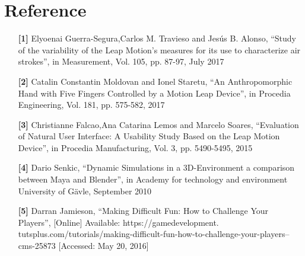 \documentclass[journal]{IEEEtran}										    %
\begin{document}
    
    \section{Reference}
        \begin{itemize}
            \item[\textbf{[1]}] Elyoenai Guerra-Segura,Carlos M. Travieso and Jesús B. Alonso, “Study of the 
            variability of the Leap Motion’s measures for its use to characterize air strokes”, 
            in Measurement, Vol. 105, pp. 87-97, July 2017

            \item[\textbf{[2]}] Catalin Constantin Moldovan and Ionel Staretu, “An Anthropomorphic Hand with Five 
            Fingers Controlled by a Motion Leap Device”, in Procedia Engineering, Vol. 181, 
            pp. 575-582, 2017
            

            \item[\textbf{[3]}] Christianne Falcao,Ana Catarina Lemos and Marcelo Soares, “Evaluation of Natural User 
            Interface: A Usability Study Based on the Leap Motion Device”, 
            in Procedia Manufacturing, Vol. 3, pp. 5490-5495, 2015

            \item[\textbf{[4]}] Dario Senkic, “Dynamic Simulations in a 3D-Environment a comparison between Maya
            and Blender”, in Academy for technology and environment University of Gävle, 
            September 2010
            

            \item[\textbf{[5]}] Darran Jamieson, “Making Difficult Fun: How to Challenge Your Players”, [Online]
            Available: https://gamedevelopment.
            tutsplus.com/tutorials/making-difficult-fun-how-to-challenge-your-players--cms-25873 [Accessed: May 20, 2016]
            
        \end{itemize}
\end{document}

